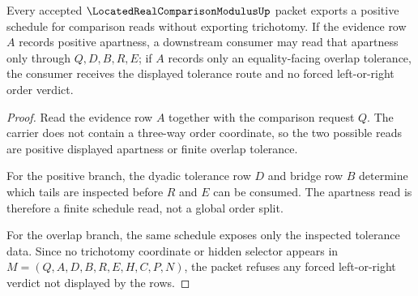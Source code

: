 \begin{theorem}
\label{thm:located-real-comparison-modulus-nontrichotomy-boundary}
Every accepted $\LocatedRealComparisonModulusUp$ packet exports a positive schedule for comparison reads without exporting trichotomy. If the evidence row $A$ records positive apartness, a downstream consumer may read that apartness only through $Q,D,B,R,E$; if $A$ records only an equality-facing overlap tolerance, the consumer receives the displayed tolerance route and no forced left-or-right order verdict.
\end{theorem}
\begin{proof}
Read the evidence row $A$ together with the comparison request $Q$. The carrier does not contain a three-way order coordinate, so the two possible reads are positive displayed apartness or finite overlap tolerance.

For the positive branch, the dyadic tolerance row $D$ and bridge row $B$ determine which tails are inspected before $R$ and $E$ can be consumed. The apartness read is therefore a finite schedule read, not a global order split.

For the overlap branch, the same schedule exposes only the inspected tolerance data. Since no trichotomy coordinate or hidden selector appears in $M=(Q,A,D,B,R,E,H,C,P,N)$, the packet refuses any forced left-or-right verdict not displayed by the rows.
\end{proof}




